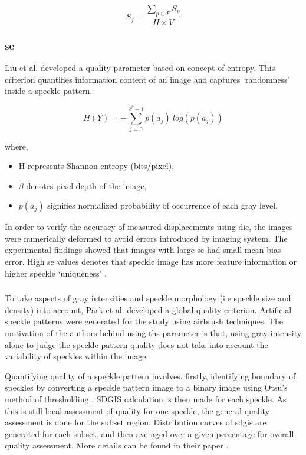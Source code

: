         \begin{equation}
            S_f = \dfrac{\sum_{p \in F} S_p}{H \times V}
            \label{eqn:global_msf}
        \end{equation}
    
    \subsubsection{\gls{se}}
        Liu et al. developed a quality parameter based on concept of entropy. This criterion quantifies information content of an image and captures `randomness' inside a speckle pattern.

        \begin{equation}
            H(Y) = - \displaystyle \sum_{j=0}^{2^{\beta} - 1} p(a_j)\ log(p(a_j)) 
        \end{equation}

        where,
        \begin{itemize}
            \item H represents Shannon entropy (bits/pixel), 
            \item $\beta$ denotes pixel depth of the image,
            \item $p(a_j)$ signifies normalized probability of occurrence of each gray level. 
        \end{itemize}

        \noindent In order to verify the accuracy of measured displacements using \gls{dic}, the images were numerically deformed to avoid errors introduced by imaging system. The experimental findings showed that images with large \gls{se} had small mean bias error. High \gls{se} values denotes that speckle image has more feature information or higher speckle `uniqueness' \cite{liu_shannon}.

    \subsubsection{}
        To take aspects of gray intensities and speckle morphology (i.e speckle size and density) into account, Park et al. developed a global quality criterion. Artificial speckle patterns were generated for the study using airbrush techniques. The motivation of the authors behind using ths parameter is that, using gray-intensity alone to judge the speckle pattern quality does not take into account the variability of speckles within the image. 
        
        \vspace{5mm}
        \noindent Quantifying quality of a speckle pattern involves, firstly, identifying boundary of speckles by converting a speckle pattern image to a binary image using Otsu's method of thresholding \cite{otsu}. \gls{SDGIS} calculation is then made for each speckle. As this is still local assessment of quality for one speckle, the general quality assessment is done for the subset region. Distribution curves of \gls{sdgis} are generated for each subset, and then averaged over a given percentage for overall quality assessment. More details can be found in their paper \cite{park_sdgis}.

